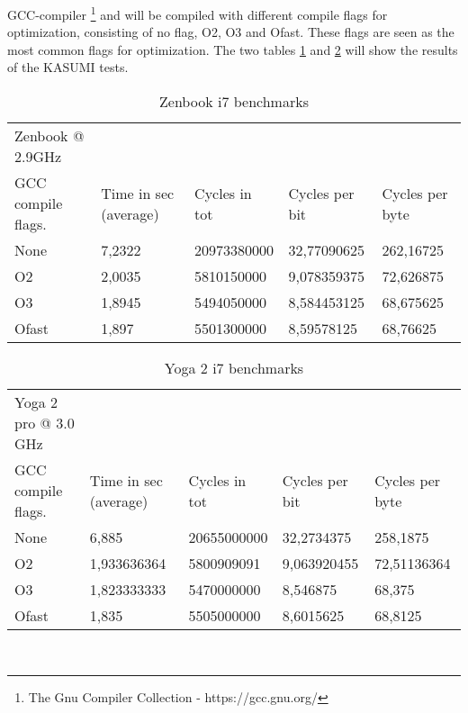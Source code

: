 GCC-compiler \footnote{The Gnu Compiler Collection -
  https://gcc.gnu.org/} and will be compiled  with different compile
flags for optimization, consisting of no flag, O2, O3 and Ofast. These
flags are seen as the most common flags for optimization. The two tables
\ref{tab:zen} and \ref{tab:yoga} will show the results of the KASUMI
tests.
\begin{table}[h!]
    \begin{tabular}{l|l|l|l|l}
     Zenbook @ 2.9GHz  & ~                     & ~             & ~              & ~               \\
    GCC compile flags. & Time in sec (average) & Cycles in tot & Cycles per bit & Cycles per byte \\ \hline
    None               & 7,2322                & 20973380000   & 32,77090625    & 262,16725       \\ \hline
    O2                 & 2,0035                & 5810150000    & 9,078359375    & 72,626875       \\ \hline
    O3                 & 1,8945                & 5494050000    & 8,584453125    & 68,675625       \\ \hline
    Ofast              & 1,897                 & 5501300000    & 8,59578125     & 68,76625        \\
    \end{tabular}
    \caption{Zenbook i7 benchmarks}
    \label{tab:zen}
\end{table}
\begin{table}[h!]
    \begin{tabular}{l|l|l|l|l}
     Yoga 2 pro @ 3.0 GHz & ~                     & ~             & ~              & ~               \\
    GCC compile flags.   & Time in sec (average) & Cycles in tot & Cycles per bit & Cycles per byte \\ \hline
    None                 & 6,885                 & 20655000000   & 32,2734375     & 258,1875        \\ \hline
    O2                   & 1,933636364           & 5800909091    & 9,063920455    & 72,51136364     \\ \hline
    O3                   & 1,823333333           & 5470000000    & 8,546875       & 68,375          \\ \hline
    Ofast                & 1,835                 & 5505000000    & 8,6015625      & 68,8125         \\
    \end{tabular}
    \caption{Yoga 2 i7 benchmarks}
    \label{tab:yoga}
\end{table}\\


